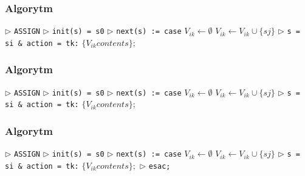 \documentclass{beamer}
\begin{document}
\begin{frame}[fragile, t]    %

\frametitle{Algorytm}
\begin{algorithmic}
\State $\triangleright$ \verb!ASSIGN!
\State $\triangleright$ \verb!init(s) = s0!
\State $\triangleright$ \verb!next(s) := case!
   		\State $V_{ik} \gets \emptyset$ 
   				\State $V_{ik} \gets V_{ik} \cup\{sj\}$
   			\EndIf
   		\EndFor
   		\State $\triangleright$ \verb!s = si & action = tk:! $\{V_{ik}contents\};$
   
\end{algorithmic}
 
\end{frame}
 
\begin{frame}[fragile, t]    %

\frametitle{Algorytm}
\begin{algorithmic}
\State $\triangleright$ \verb!ASSIGN!
\State $\triangleright$ \verb!init(s) = s0!
\State $\triangleright$ \verb!next(s) := case!
   		\State $V_{ik} \gets \emptyset$ 
   				\State $V_{ik} \gets V_{ik} \cup\{sj\}$
   			\EndIf
   		\EndFor
   		\State $\triangleright$ \verb!s = si & action = tk:! $\{V_{ik}contents\};$
   	\EndFor

\end{algorithmic}
 
\end{frame}
 
\begin{frame}[fragile, t]    %

\frametitle{Algorytm}
\begin{algorithmic}
\State $\triangleright$ \verb!ASSIGN!
\State $\triangleright$ \verb!init(s) = s0!
\State $\triangleright$ \verb!next(s) := case!
   		\State $V_{ik} \gets \emptyset$ 
   				\State $V_{ik} \gets V_{ik} \cup\{sj\}$
   			\EndIf
   		\EndFor
   		\State $\triangleright$ \verb!s = si & action = tk:! $\{V_{ik}contents\};$
   \EndFor
\EndFor
\State $\triangleright$ \verb!esac;!
\end{algorithmic}
 
\end{frame}
 
\end{document}

